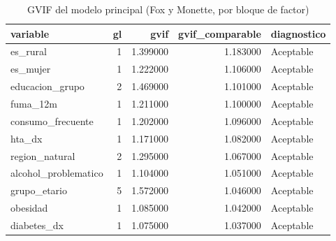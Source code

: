 \begin{table}[htbp]
\caption{GVIF del modelo principal (Fox y Monette, por bloque de factor)}
\label{tab:tabla_05c_gvif}
\begin{tabular}{lrrrl}
\toprule
variable & gl & gvif & gvif\_comparable & diagnostico \\
\midrule
es\_rural & 1 & 1.399000 & 1.183000 & Aceptable \\
es\_mujer & 1 & 1.222000 & 1.106000 & Aceptable \\
educacion\_grupo & 2 & 1.469000 & 1.101000 & Aceptable \\
fuma\_12m & 1 & 1.211000 & 1.100000 & Aceptable \\
consumo\_frecuente & 1 & 1.202000 & 1.096000 & Aceptable \\
hta\_dx & 1 & 1.171000 & 1.082000 & Aceptable \\
region\_natural & 2 & 1.295000 & 1.067000 & Aceptable \\
alcohol\_problematico & 1 & 1.104000 & 1.051000 & Aceptable \\
grupo\_etario & 5 & 1.572000 & 1.046000 & Aceptable \\
obesidad & 1 & 1.085000 & 1.042000 & Aceptable \\
diabetes\_dx & 1 & 1.075000 & 1.037000 & Aceptable \\
\bottomrule
\end{tabular}
\end{table}
